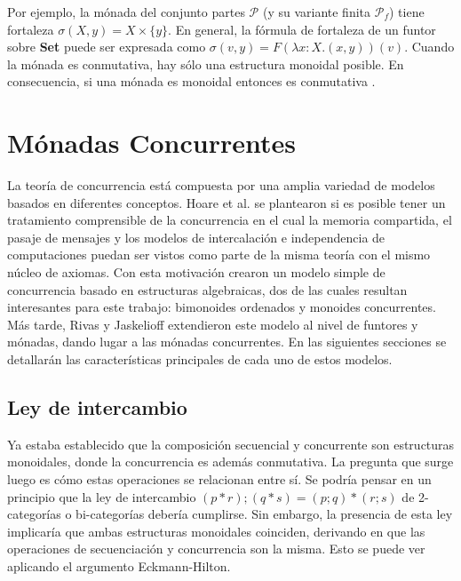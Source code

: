 Por ejemplo, la mónada del conjunto partes $\mathcal{P}$ (y su variante finita $\mathcal{P}_f$) tiene fortaleza $\sigma(X,y) = X \times \{y\}$. En general, la fórmula de fortaleza de un funtor sobre \textbf{Set} puede ser expresada como $\sigma(v,y) = \mathit{F}(\lambda x : X . (x,y))(v)$. Cuando la mónada es conmutativa, hay sólo una estructura monoidal posible. En consecuencia, si una mónada es monoidal entonces es conmutativa \cite{kock:1970}. 

\section{Mónadas Concurrentes}\label{monconc:mc}

La teoría de concurrencia está compuesta por una amplia variedad de modelos basados en diferentes conceptos. Hoare et al. \cite{hoare:2011} se plantearon si es posible tener un tratamiento comprensible de la concurrencia en el cual la memoria compartida, el pasaje de mensajes y los modelos de intercalación e independencia de computaciones puedan ser vistos como parte de la misma teoría con el mismo núcleo de axiomas. Con esta motivación crearon un modelo simple de concurrencia basado en estructuras algebraicas, dos de las cuales resultan interesantes para este trabajo: bimonoides ordenados y monoides concurrentes. Más tarde, Rivas y Jaskelioff \cite{rivas:2019} extendieron este modelo al nivel de funtores y mónadas, dando lugar a las mónadas concurrentes. En las siguientes secciones se detallarán las características principales de cada uno de estos modelos.

\subsection{Ley de intercambio}\label{mc:interchange}

Ya estaba establecido que la composición secuencial y concurrente son estructuras monoidales, donde la concurrencia es además conmutativa. La pregunta que surge luego es cómo estas operaciones se relacionan entre sí. Se podría pensar en un principio que la ley de intercambio $(p * r) ; (q * s) = (p ; q) * (r ; s)$ de 2-categorías o bi-categorías debería cumplirse.  Sin embargo, la presencia de esta ley implicaría que ambas estructuras monoidales coinciden, derivando en que las operaciones de secuenciación y concurrencia son la misma. Esto se puede ver aplicando el argumento Eckmann-Hilton. 

